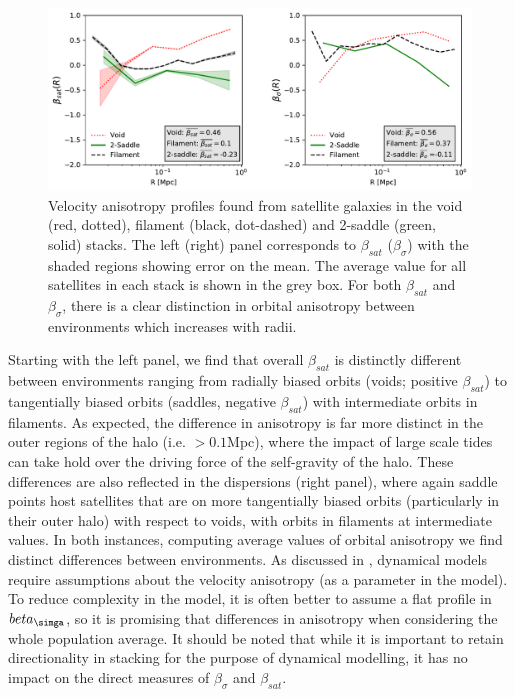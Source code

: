 \begin{figure}
	\includegraphics[width=\linewidth]{thesis/latex/dyn_mod_files/disperse_beta_paper.pdf}
    \caption{Velocity anisotropy profiles found from satellite galaxies in the void (red, dotted), filament (black, dot-dashed) and 2-saddle (green, solid) stacks. The left (right) panel corresponds to $\beta_{sat}$ ($\beta_{\sigma}$) with the shaded regions showing error on the mean. The average value for all satellites in each stack is shown in the grey box. For both $\beta_{sat}$ and $\beta_{\sigma}$, there is a clear distinction in orbital anisotropy between environments which increases with radii.}
    \label{fig:beta_stack}
\end{figure}

Starting with the left panel, we find that overall $\beta_{sat}$ is distinctly different between environments ranging from radially biased orbits (voids; positive $\beta_{sat}$) to tangentially biased orbits (saddles, negative $\beta_{sat}$) with intermediate orbits in filaments. As expected, the difference in anisotropy is far more distinct in the outer regions of the halo (i.e. $> 0.1$Mpc), where the impact of large scale tides can take hold over the driving force of the self-gravity of the halo. These differences are also reflected in the dispersions (right panel), where again saddle points host satellites that are on more tangentially biased orbits (particularly in their outer halo) with respect to voids, with orbits in filaments at intermediate values. In both instances, computing average values of orbital anisotropy we find distinct differences between environments. As discussed in \red{\S}, dynamical models require assumptions about the velocity anisotropy (as a parameter in the model). To reduce complexity in the model, it is often better to assume a flat profile in $beta_{\simga}$, so it is promising that differences in anisotropy when considering the whole population average. It should be noted that while it is important to retain directionality in stacking for the purpose of dynamical modelling, it has no impact on the direct measures of $\beta_{\sigma}$ and $\beta_{sat}$.

